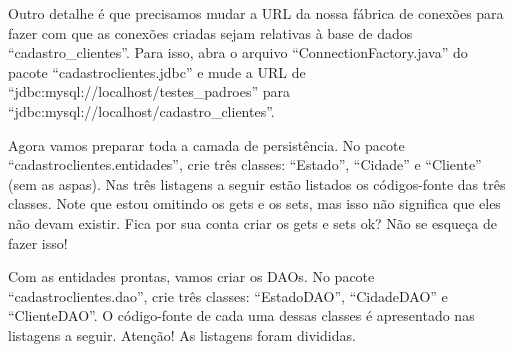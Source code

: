 Outro detalhe é que precisamos mudar a URL da nossa fábrica de conexões para fazer com que as conexões criadas sejam relativas à base de dados ``cadastro\_clientes''. Para isso, abra o arquivo ``ConnectionFactory.java'' do pacote ``cadastroclientes.jdbc'' e mude a URL de ``jdbc:mysql://localhost/testes\_padroes'' para ``jdbc:mysql://localhost/cadastro\_clientes''.

Agora vamos preparar toda a camada de persistência. No pacote ``cadastroclientes.entidades'', crie três classes: ``Estado'', ``Cidade'' e ``Cliente'' (sem as aspas). Nas três listagens a seguir estão listados os códigos-fonte das três classes. Note que estou omitindo os gets e os sets, mas isso não significa que eles não devam existir. Fica por sua conta criar os gets e sets ok? Não se esqueça de fazer isso!




Com as entidades prontas, vamos criar os DAOs. No pacote ``cadastroclientes.dao'', crie três classes: ``EstadoDAO'', ``CidadeDAO'' e ``ClienteDAO''. O código-fonte de cada uma dessas classes é apresentado nas listagens a seguir. Atenção! As listagens foram divididas.




